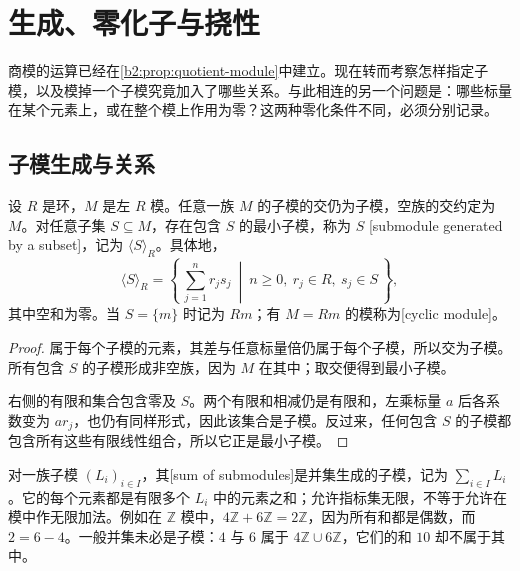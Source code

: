 
\section{生成、零化子与挠性}
\label{b2:sec:0203}

商模的运算已经在\cref{b2:prop:quotient-module}中建立。现在转而考察怎样指定子模，以及模掉一个子模究竟加入了哪些关系。与此相连的另一个问题是：哪些标量在某个元素上，或在整个模上作用为零？这两种零化条件不同，必须分别记录。


\subsection{子模生成与关系}
\label{b2:subsec:0203:01}

\begin{proposition}\label{b2:prop:generated-submodule}
	设 \(R\) 是环，\(M\) 是左 \(R\) 模。任意一族 \(M\) 的子模的交仍为子模，空族的交约定为 \(M\)。对任意子集 \(S\subseteq M\)，存在包含 \(S\) 的最小子模，称为 \(S\) [submodule generated by a subset]，记为 \(\langle S\rangle_R\)。具体地，
	\[
		\langle S\rangle_R= \left\{\,\sum_{j=1}^n r_js_j\ \middle|\ n\ge0,\ r_j\in R,\ s_j\in S\,\right\},
	\]
	其中空和为零。当 \(S=\{m\}\) 时记为 \(Rm\)；有 \(M=Rm\) 的模称为[cyclic module]。
\end{proposition}
\begin{proof}
	属于每个子模的元素，其差与任意标量倍仍属于每个子模，所以交为子模。所有包含 \(S\) 的子模形成非空族，因为 \(M\) 在其中；取交便得到最小子模。

	右侧的有限和集合包含零及 \(S\)。两个有限和相减仍是有限和，左乘标量 \(a\) 后各系数变为 \(ar_j\)，也仍有同样形式，因此该集合是子模。反过来，任何包含 \(S\) 的子模都包含所有这些有限线性组合，所以它正是最小子模。
\end{proof}

对一族子模 \((L_i)_{i\in I}\)，其[sum of submodules]是并集生成的子模，记为 \(\sum_{i\in I}L_i\)。它的每个元素都是有限多个 \(L_i\) 中的元素之和；允许指标集无限，不等于允许在模中作无限加法。例如在 \(\mathbb Z\) 模中，\(4\mathbb Z+6\mathbb Z=2\mathbb Z\)，因为所有和都是偶数，而 \(2=6-4\)。一般并集未必是子模：\(4\) 与 \(6\) 属于 \(4\mathbb Z\cup6\mathbb Z\)，它们的和 \(10\) 却不属于其中。

